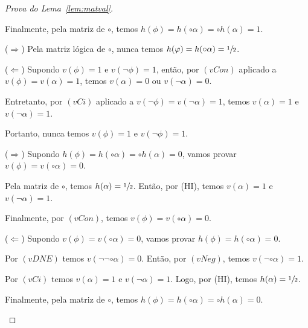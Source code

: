 \begin{proof}[Prova do Lema~\ref{lem:matval}]
\begin{provaporcasos}
\begin{provaporsubcasos}
\begin{provaporsubsubcasos}
                                Finalmente, pela matriz de $\circ$, temos $h(\phi) = h(\circ \alpha) = \circ h(\alpha) = 1$.
                        \end{provaporsubsubcasos}
                        
                        
                        ($\Longrightarrow$) Pela matriz lógica de $\circ$, nunca temos $h(\varphi) = h(\circ \alpha) = \sfrac{1}{2}{}$.
                        
                        ($\Longleftarrow$) Supondo $v(\phi) = 1$ e $v(\neg \phi) = 1$, então, por $(vCon)$ aplicado a $v(\phi) = v(\alpha) = 1$, temos $v(\alpha) = 0$ ou $v(\neg \alpha) = 0$. 
                        
                        Entretanto, por $(vCi)$ aplicado a $v(\neg \phi) = v(\neg \alpha) = 1$, temos $v(\alpha) = 1$ e $v(\neg \alpha) = 1$.

                        Portanto, nunca temos $v(\phi) = 1$ e $v(\neg \phi) = 1$.

                        
                    

                        ($\Longrightarrow$) Supondo $h(\phi) = h(\circ \alpha) = \circ h(\alpha) = 0$, vamos provar $v(\phi) = v(\circ \alpha) = 0$.

                        Pela matriz de $\circ$, temos $h(\alpha) = \sfrac{1}{2}{}$. Então, por (HI), temos $v(\alpha) = 1$ e $v(\neg \alpha) = 1$. 
                        
                        Finalmente, por $(vCon)$, temos $v(\phi) = v(\circ \alpha) = 0$.
                    
                        ($\Longleftarrow$) Supondo $v(\phi) = v(\circ \alpha) = 0$, vamos provar $h(\phi) = h(\circ \alpha) = 0$.

                        Por $(vDNE)$ temos $v(\neg \neg \circ \alpha) = 0$. Então, por $(vNeg)$, temos $v(\neg \circ \alpha) = 1$.

                        Por $(vCi)$ temos $v(\alpha) = 1$ e $v(\neg \alpha) = 1$. Logo, por (HI), temos $h(\alpha) = \sfrac{1}{2}{}$.

                        Finalmente, pela matriz de $\circ$, temos $h(\phi) = h(\circ \alpha) = \circ h(\alpha) = 0$.
                    

\end{provaporsubcasos}
\end{provaporcasos}
\end{proof}
